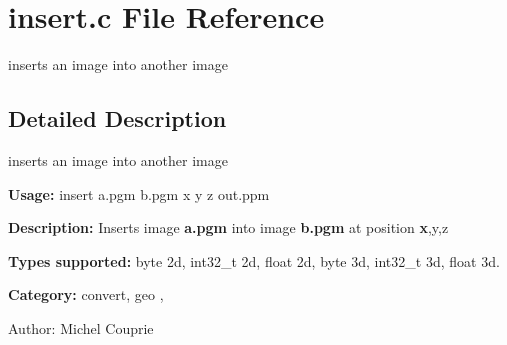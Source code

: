 \section{insert.c File Reference}
\label{insert_8c}
inserts an image into another image  




\label{_details}
\subsection{Detailed Description}
inserts an image into another image 

{\bf Usage:} insert a.pgm b.pgm x y z out.ppm

{\bf Description:} Inserts image {\bf a.pgm} into image {\bf b.pgm} at position {\bf x},y,z

{\bf Types supported:} byte 2d, int32\_\-t 2d, float 2d, byte 3d, int32\_\-t 3d, float 3d.

{\bf Category:} convert, geo ,

\begin{Desc}
\item[Author:]Michel Couprie \end{Desc}
